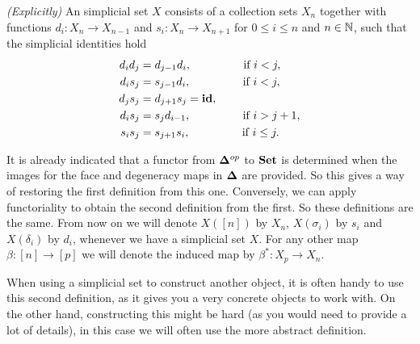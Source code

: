 \begin{definition}
	\emph{(Explicitly)} An simplicial set $X$ consists of a collection sets $X_n$ together with functions $d_i: X_n \to X_{n-1}$ and $s_i: X_n \to X_{n+1}$ for $0 \leq i \leq n$ and $n \in \mathbb{N}$, such that the simplicial identities hold
	\begin{align}
		d_i d_j &= d_{j-1} d_i,  \hspace{1.5cm} \text{ if } i < j,\\
		d_i s_j &= s_{j-1} d_i,  \hspace{1.5cm} \text{ if } i < j,\\
		d_j s_j &= d_{j+1} s_j = \mathbf{id},\\
		d_i s_j &= s_j d_{i-1},  \hspace{1.5cm} \text{ if } i > j+1,\\
		s_i s_j &= s_{j+1} s_i,  \hspace{1.5cm} \text{ if } i \leq j.
	\end{align}
\end{definition}

It is already indicated that a functor from $\mathbf{\Delta}^{op}$ to $\mathbf{Set}$ is determined when the images for the face and degeneracy maps in $\mathbf{\Delta}$ are provided. So this gives a way of restoring the first definition from this one. Conversely, we can apply functoriality to obtain the second definition from the first. So these definitions are the same. From now on we will denote $X([n])$ by $X_n$, $X(\sigma_i)$ by $s_i$ and $X(\delta_i)$ by $d_i$, whenever we have a simplicial set $X$. For any other map $\beta : [n] \to [p]$ we will denote the induced map by $\beta^\ast: X_p \to X_n$.

When using a simplicial set to construct another object, it is often handy to use this second definition, as it gives you a very concrete objects to work with. On the other hand, constructing this might be hard (as you would need to provide a lot of details), in this case we will often use the more abstract definition.

